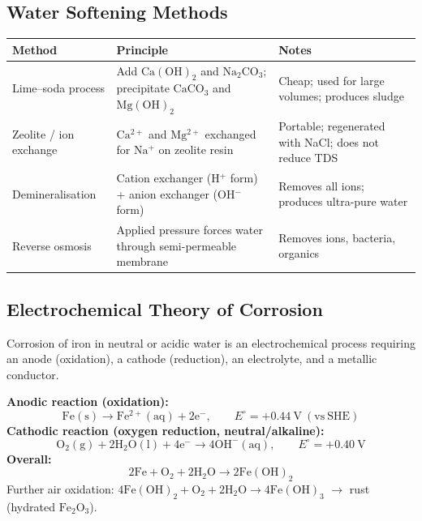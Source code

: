 \documentclass[12pt,a4paper]{article}
\begin{document}
\subsection{Water Softening Methods}
\begin{tabularx}{\linewidth}{|B{2.6cm}|Y|Y|}
\hline
\textbf{Method} & \textbf{Principle} & \textbf{Notes} \\
\hline
Lime--soda process & Add $\mathrm{Ca(OH)_2}$ and $\mathrm{Na_2CO_3}$; precipitate $\mathrm{CaCO_3}$ and $\mathrm{Mg(OH)_2}$ & Cheap; used for large volumes; produces sludge \\
\hline
Zeolite / ion exchange & $\mathrm{Ca^{2+}}$ and $\mathrm{Mg^{2+}}$ exchanged for $\mathrm{Na^+}$ on zeolite resin & Portable; regenerated with NaCl; does not reduce TDS \\
\hline
Demineralisation & Cation exchanger (H$^+$ form) + anion exchanger (OH$^-$ form) & Removes all ions; produces ultra-pure water \\
\hline
Reverse osmosis & Applied pressure forces water through semi-permeable membrane & Removes ions, bacteria, organics \\
\hline
\end{tabularx}

\subsection{Electrochemical Theory of Corrosion}
Corrosion of iron in neutral or acidic water is an electrochemical process requiring an anode (oxidation), a cathode (reduction), an electrolyte, and a metallic conductor.

\begin{tcolorbox}[formulabox, title={Iron Corrosion Half-Reactions}]
\textbf{Anodic reaction (oxidation):}
\[
\mathrm{Fe(s) \to Fe^{2+}(aq) + 2e^-}, \qquad E^\circ = +0.44\ \mathrm{V\ (vs\ SHE)}
\]
\textbf{Cathodic reaction (oxygen reduction, neutral/alkaline):}
\[
\mathrm{O_2(g) + 2H_2O(l) + 4e^- \to 4OH^-(aq)}, \qquad E^\circ = +0.40\ \mathrm{V}
\]
\textbf{Overall:}
\[
\mathrm{2Fe + O_2 + 2H_2O \to 2Fe(OH)_2}
\]
Further air oxidation: $\mathrm{4Fe(OH)_2 + O_2 + 2H_2O \to 4Fe(OH)_3}$ $\to$ rust (hydrated $\mathrm{Fe_2O_3}$).
\end{tcolorbox}
\end{document}
